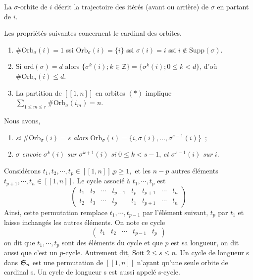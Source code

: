La $\sigma$-orbite de $i$ décrit la trajectoire des itérés (avant ou arrière) de $\sigma$ en partant de $i$.

\begin{remarque}
    Les propriétés suivantes concernent le cardinal des orbites.

\begin{enumerate}
    \item $\# \text{Orb}_{\sigma}(i) = 1$ ssi $\text{Orb}_{\sigma}(i) = \{i\}$ ssi $\sigma(i) = i$ ssi $i \notin \text{Supp}(\sigma)$.
    \item Si $\text{ord}(\sigma) = d$ alors $\{\sigma^k(i) ; k \in \mathbb{Z} \} = \{\sigma^k(i) ; 0 \leq k < d\}$, d’où $\# \text{Orb}_{\sigma}(i) \leq d$.
    \item La partition de $[[1,n]]$ en orbites $(*)$ implique $\sum_{1 \leq m \leq r} \# \text{Orb}_{\sigma}(i_m) = n$.
\end{enumerate}
\end{remarque}

 \begin{proposition}
        Nous avons,
        \begin{enumerate}
            \item \textit{si} $\# \text{Orb}_{\sigma}(i) = s$ \textit{alors} $\text{Orb}_{\sigma}(i) = \{i, \sigma(i), \dots, \sigma^{s-1}(i)\}$~;
    \item $\sigma$ \textit{envoie} $\sigma^k(i)$ \textit{sur} $\sigma^{k+1}(i)$ \textit{si} $0 \leq k < s-1$, \textit{et} $\sigma^{s-1}(i)$ \textit{sur} $i$.
    \end{enumerate}
    \end{proposition}

\begin{definition}
        
            Considérons $t_1,t_2,\cdots,t_p\in [[1,n]]$,$p\geq 1,$ et les $n-p$ autres éléments $t_{p+1},\cdots,t_n \in [[1,n]]$. Le cycle associé à $t_1,\cdots,t_p$ est
            \[
            \begin{pmatrix}
                t_1 &t_2&\cdots&t_{p-1}&t_p&t_{p+1}&\cdots&t_n\\
                t_2&t_3&\cdots&t_p&t_1&t_{p+1}&\cdots& t_n          \end{pmatrix}
            \]
            Ainsi, cette permutation remplace $t_1,\cdots,t_{p-1}$ par l'élément suivant, $t_p$ par $t_1$ et laisse inchangés les autres éléments.
            On note ce cycle
            \[
            \begin{pmatrix}
                t_1&t_2&\cdots&t_{p-1}&t_p
            \end{pmatrix}
            \]
            on dit que $t_1,\cdots,t_p$ sont des éléments du cycle et que $p$ est sa longueur, on dit aussi que c'est un $p$-cycle.
            Autrement dit,
            Soit $2 \leq s \leq n$. Un cycle de longueur s dans $\mathfrak{S}_n$ est une permutation de $[[1,n]]$
n’ayant qu’une seule orbite de cardinal s. Un cycle de longueur s est aussi appelé s-cycle.
    \end{definition}

